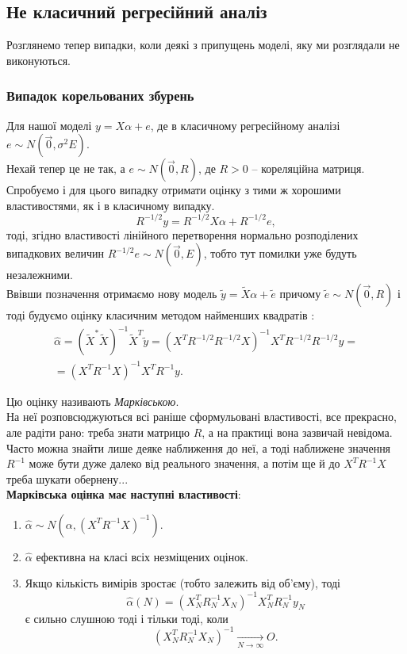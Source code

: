 \subsection{Не класичний регресійний аналіз}

Розглянемо тепер випадки, коли деякі з припущень моделі, яку ми розглядали не виконуються.

\subsubsection{Випадок корельованих збурень}

Для нашої моделі $ y = X \alpha + e$, де в класичному регресійному аналізі $e \sim N(\vec0, \sigma^2E)$. \\

Нехай тепер це не так, а $e \sim N(\vec0, R)$, де $R > 0$ -- кореляційна матриця. Спробуємо і для цього випадку отримати оцінку з тими ж хорошими властивостями, як і в класичному випадку. \\

\[ R^{-1/2}y = R^{-1/2}X\alpha + R^{-1/2}e, \] тоді, згідно властивості лінійного перетворення нормально розподілених випадкових величин $R^{-1/2}e \sim N(\vec0, E)$, тобто тут помилки уже будуть незалежними. \\

Ввівши позначення отримаємо нову модель $\widetilde{y} = \widetilde{X}\alpha + \widetilde{e}$ причому $\widetilde{e}\sim N(\vec0,R)$ і тоді будуємо оцінку класичним методом найменших квадратів : \begin{multline*} \widehat{\alpha} = (\widetilde{X}^*\widetilde{X})^{-1}\widetilde{X}^T\widetilde{y}=(X^TR^{-1/2}R^{-1/2}X)^{-1}X^TR^{-1/2}R^{-1/2}y=\\=(X^TR^{-1}X)^{-1}X^TR^{-1}y. \end{multline*}

Цю оцінку називають \textit{Марківською}. \\

На неї розповсюджуються всі раніше сформульовані властивості, все прекрасно, але радіти рано: треба знати матрицю $R$, а на практиці вона зазвичай невідома. Часто можна знайти лише деяке наближення до неї, а тоді наближене значення $R^{-1}$ може бути дуже далеко від реального значення, а потім ще й до $X^TR^{-1}X$ треба шукати обернену... \\

\textbf{Марківська оцінка має наступні властивості}:
\begin{enumerate}
	\item $\widehat{\alpha}\sim N(\alpha, (X^TR^{-1}X)^{-1})$. 
	
	\item $\widehat{\alpha}$ ефективна на класі всіх незміщених оцінок.

	\item Якщо кількість вимірів зростає (тобто залежить від об’єму), тоді \[ \widehat{\alpha}(N) = (X_N^TR_N^{-1}X_N)^{-1}X_N^TR_N^{-1}y_N \] є сильно слушною тоді і тільки тоді, коли \[ (X_N^TR_N^{-1}X_N)^{-1} \xrightarrow[N\to\infty]{} O. \]
\end{enumerate}

